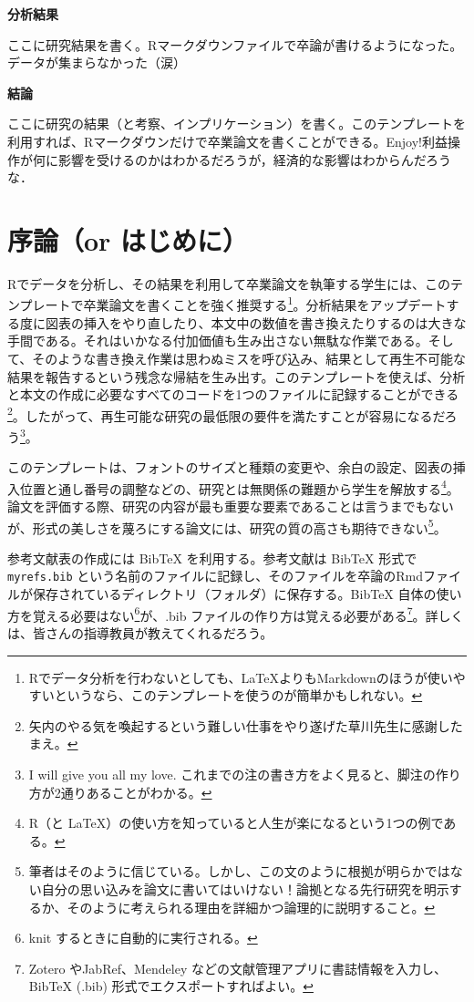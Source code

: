 \documentclass[10.5pt,a4paper,lualatex,ja=standard]{bxjsarticle}
\begin{document}
\vspace{4truemm}
\noindent
\textbf{分析結果}

ここに研究結果を書く。Rマークダウンファイルで卒論が書けるようになった。データが集まらなかった（涙）

\vspace{4truemm}
\noindent
\textbf{結論}

ここに研究の結果（と考察、インプリケーション）を書く。このテンプレートを利用すれば、Rマークダウンだけで卒業論文を書くことができる。Enjoy!利益操作が何に影響を受けるのかはわかるだろうが，経済的な影響はわからんだろうな．

\newpage
{}

\section{序論（or はじめに）}\label{ux5e8fux8ad6or-ux306fux3058ux3081ux306b}

Rでデータを分析し、その結果を利用して卒業論文を執筆する学生には、このテンプレートで卒業論文を書くことを強く推奨する\footnote{Rでデータ分析を行わないとしても、\LaTeX よりもMarkdownのほうが使いやすいというなら、このテンプレートを使うのが簡単かもしれない。}。分析結果をアップデートする度に図表の挿入をやり直したり、本文中の数値を書き換えたりするのは大きな手間である。それはいかなる付加価値も生み出さない無駄な作業である。そして、そのような書き換え作業は思わぬミスを呼び込み、結果として再生不可能な結果を報告するという残念な帰結を生み出す。このテンプレートを使えば、分析と本文の作成に必要なすべてのコードを1つのファイルに記録することができる\footnote{矢内のやる気を喚起するという難しい仕事をやり遂げた草川先生に感謝したまえ。}。したがって、再生可能な研究の最低限の要件を満たすことが容易になるだろう\footnote{I will give you all my love. これまでの注の書き方をよく見ると、脚注の作り方が2通りあることがわかる。}。

このテンプレートは、フォントのサイズと種類の変更や、余白の設定、図表の挿入位置と通し番号の調整などの、研究とは無関係の難題から学生を解放する\footnote{R（と \LaTeX ）の使い方を知っていると人生が楽になるという1つの例である。}。 論文を評価する際、研究の内容が最も重要な要素であることは言うまでもないが、形式の美しさを蔑ろにする論文には、研究の質の高さも期待できない\footnote{筆者はそのように信じている。しかし、この文のように根拠が明らかではない自分の思い込みを論文に書いてはいけない！論拠となる先行研究を明示するか、そのように考えられる理由を詳細かつ論理的に説明すること。}。

参考文献表の作成には BibTeX を利用する。参考文献は BibTeX 形式で \texttt{myrefs.bib} という名前のファイルに記録し、そのファイルを卒論のRmdファイルが保存されているディレクトリ（フォルダ）に保存する。BibTeX 自体の使い方を覚える必要はない\footnote{knit するときに自動的に実行される。}が、.bib ファイルの作り方は覚える必要がある\footnote{Zotero やJabRef、Mendeley などの文献管理アプリに書誌情報を入力し、BibTeX (.bib) 形式でエクスポートすればよい。}。詳しくは、皆さんの指導教員が教えてくれるだろう。
\end{document}
